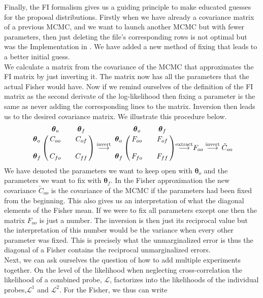 \documentclass[../main.tex]{subfiles}
\begin{document}
Finally, the FI formalism gives us a guiding principle to make educated guesses for the proposal distributions. Firstly when we have already a covariance matrix of a previous MCMC, and we want to launch another MCMC but with fewer parameters, then just deleting the file's corresponding rows is not optimal but was the Implementation in \montepython. We have added a new method of fixing that leads to a better initial guess.\\
We calculate a matrix from the covariance of the MCMC that approximates the FI matrix by just inverting it. The matrix now has all the parameters that the actual Fisher would have. Now if we remind ourselves of the definition of the FI matrix as the second derivate of the log-likelihood then fixing a parameter is the same as never adding the corresponding lines to the matrix. Inversion then leads us to the desired covariance matrix. We illustrate this procedure below.
\begin{equation}
    \bordermatrix{~ & \boldsymbol{\theta}_o && \boldsymbol{\theta}_f \cr
    \boldsymbol{\theta}_o &C_{oo}&& C_{of}\cr
    \cr
    \boldsymbol{\theta}_f &C_{fo}&& C_{ff}\cr } \overset{\mathrm{invert}}{\longrightarrow}     
    \bordermatrix{~ & \boldsymbol{\theta}_o && \boldsymbol{\theta}_f \cr
    \boldsymbol{\theta}_o &F_{oo}&& F_{of}\cr
    \cr
    \boldsymbol{\theta}_f &F_{fo}&& F_{ff}\cr } {\overset{\mathrm{extract}}{\longrightarrow}} F_{oo} \overset{\mathrm{invert}}{\longrightarrow} \tilde{C}_{oo} \nonumber
\end{equation}
We have denoted the parameters we want to keep open with $\boldsymbol{\theta}_o$ and the parameters we want to fix with $\boldsymbol{\theta}_f$. In the Fisher approximation the new covariance $\tilde{C}_{oo}$ is the covariance of the MCMC if the parameters had been fixed from the beginning. This also gives us an interpretation of what the diagonal elements of the Fisher mean. If we were to fix all parameters except one then the matrix $F_{oo}$ is just a number. The inversion is then just its reciprocal value but the interpretation of this number would be the variance when every other parameter was fixed. This is precisely what the unmarginalized error is thus the diagonal of a Fisher contains the reciprocal unmarginalized errors.\\
Next, we can ask ourselves the question of how to add multiple experiments together. On the level of the likelihood when neglecting cross-correlation the likelihood of a combined probe, $\mathcal{L}$, factorizes into the likelihoods of the individual probes,$\mathcal{L}^1$ and $\mathcal{L}^2$. For the Fisher, we thus can write 
\end{document}
